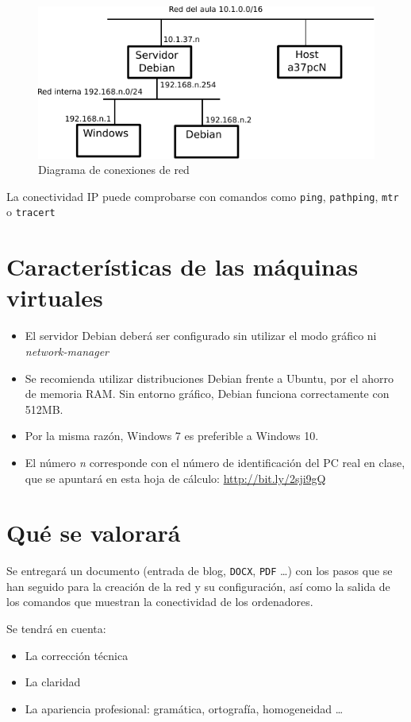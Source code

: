 \begin{figure}[h]
  \center\includegraphics{media/practica-red-ip.pdf}
  \caption{Diagrama de conexiones de red}
  \label{fig:redesip}
\end{figure}

La conectividad IP puede comprobarse con comandos como \texttt{ping}, \texttt{pathping}, \texttt{mtr} o \texttt{tracert}


\section{Características de las máquinas virtuales}
\begin{itemize}
\item El servidor Debian deberá ser configurado sin utilizar el modo gráfico ni \textit{network-manager}
\item Se recomienda utilizar distribuciones Debian frente a Ubuntu, por el ahorro de memoria RAM. Sin entorno gráfico, Debian funciona correctamente con 512MB.
\item Por la misma razón, Windows 7 es preferible a Windows 10.
  
\item El número \textit{n} corresponde con el número de identificación del PC real en clase, que se apuntará en esta hoja de cálculo: \url{http://bit.ly/2sji9gQ}
\end{itemize}

\section{Qué se valorará}
Se entregará un documento (entrada de blog, \texttt{DOCX}, \texttt{PDF} \ldots) con los pasos que se han seguido para la creación de la red y su configuración, así como la salida de los comandos que muestran la conectividad de los ordenadores.

Se tendrá en cuenta:
\begin{itemize}
\item La corrección técnica
\item La claridad
\item La apariencia profesional: gramática, ortografía, homogeneidad \ldots
\end{itemize}


